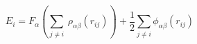 \documentclass[12pt]{article}
\begin{document}
$$
   E_i = F_\alpha \left(\sum_{j \neq i}\ 
   \rho_{\alpha\beta} (r_{ij})\right) + 
   \frac{1}{2} \sum_{j \neq i} \phi_{\alpha\beta} (r_{ij})
$$
\end{document}
